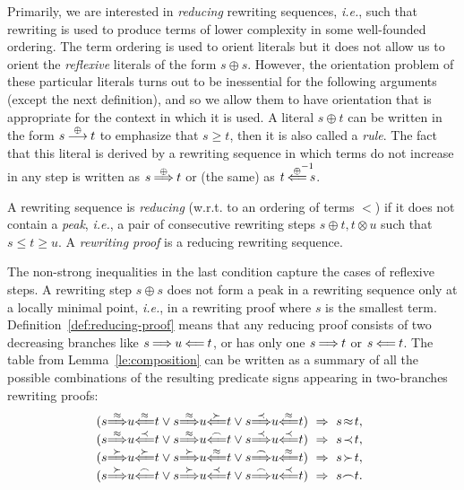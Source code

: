 Primarily, we are interested in {\em reducing} rewriting sequences, {\em i.e.}, 
such that rewriting is used to produce terms of lower complexity in some 
well-founded ordering.  The term ordering is used to orient literals but it
does not allow us to orient the {\em reflexive} literals of the form $s\oplus s$.
However, the orientation problem of these particular literals
turns out to be inessential for the following arguments (except the next 
definition), and so we allow them to have orientation that is appropriate for 
the context in which it is used. A literal \(s\oplus t\) can be written in the 
form \(s\mathbin{\stackrel{\oplus}{\longrightarrow}} t\) to emphasize that $s\geq t$, then it is also called a {\em
rule}. The fact that this literal is derived by a rewriting sequence in which 
terms do not increase in any step is written as \(s \mathbin{\stackrel{\oplus}{\Longrightarrow}} t\) or (the 
same) as \(t \oTT{\oplus \rlap{${}^{-1}$}}s\).
\begin{DEFINITION} \label{def:reducing-proof}
A rewriting sequence is {\em reducing} (w.r.t. to an ordering of terms
$<$) if it does not contain a {\em peak}, {\em i.e.}, a pair of consecutive
rewriting steps \(s\oplus t,t\otimes u\) such that \(s\leq t\geq u\).
A {\em rewriting proof} is a reducing rewriting sequence.
\end{DEFINITION}
The non-strong inequalities in the last condition capture the cases of
reflexive steps. A rewriting step \(s\oplus s\) does not form a peak
in a rewriting sequence only at a locally minimal point,
{\em i.e.}, in a rewriting proof where $s$ is the smallest term.
Definition~\ref {def:reducing-proof} means that any reducing proof consists of 
two decreasing branches like \(s\mathbin{\stackrel{}{\Longrightarrow}}u\mathbin{\stackrel{}{\Longleftarrow}}t\), or has only one \(s\mathbin{\stackrel{}{\Longrightarrow}}t\) 
or \(s\mathbin{\stackrel{}{\Longleftarrow}}t\). The table from Lemma~\ref{le:composition} can be written as a 
summary of all the possible combinations of the resulting predicate signs 
appearing in two-branches rewriting proofs:
\[\begin{array}%
 {@{(s}c@{u}c@{t\lor s}c@{u}c@{t\lor s}c@{u}c@{t)\ \impl\ s}c@{t}c}
\TTo\Eq   & \oTT\Eq   & \TTo\Eq   & \oTT\Cont & \TTo\Incl & \oTT\Eq   & \Eq   &,\\
\TTo\Eq   & \oTT\Incl & \TTo\Eq   & \oTT\Int  & \TTo\Incl & \oTT\Incl & \Incl &,\\
\TTo\Cont & \oTT\Cont & \TTo\Cont & \oTT\Eq   & \TTo\Int  & \oTT\Eq   & \Cont &,\\
\TTo\Cont & \oTT\Int  & \TTo\Cont & \oTT\Incl & \TTo\Int  & \oTT\Incl & \Int  &.
\end{array}\]
